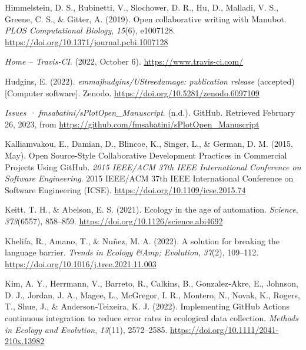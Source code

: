 \begin{CSLReferences}{1}{0}
\leavevmode{}%
Himmelstein, D. S., Rubinetti, V., Slochower, D. R., Hu, D., Malladi, V. S., Greene, C. S., \& Gitter, A. (2019). Open collaborative writing with Manubot. \emph{PLOS Computational Biology}, \emph{15}(6), e1007128. \url{https://doi.org/10.1371/journal.pcbi.1007128}

\leavevmode{}%
\emph{Home -- Travis-CI}. (2022, October 6). \url{https://www.travis-ci.com/}

\leavevmode{}%
Hudgins, E. (2022). \emph{emmajhudgins/UStreedamage: publication release} (accepted) {[}Computer software{]}. Zenodo. \url{https://doi.org/10.5281/zenodo.6097109}

\leavevmode{}%
\emph{Issues · fmsabatini/sPlotOpen\_Manuscript}. (n.d.). GitHub. Retrieved February 26, 2023, from \url{https://github.com/fmsabatini/sPlotOpen_Manuscript}

\leavevmode{}%
Kalliamvakou, E., Damian, D., Blincoe, K., Singer, L., \& German, D. M. (2015, May). Open Source-Style Collaborative Development Practices in Commercial Projects Using GitHub. \emph{2015 IEEE/ACM 37th IEEE International Conference on Software Engineering}. 2015 IEEE/ACM 37th IEEE International Conference on Software Engineering (ICSE). \url{https://doi.org/10.1109/icse.2015.74}

\leavevmode{}%
Keitt, T. H., \& Abelson, E. S. (2021). Ecology in the age of automation. \emph{Science}, \emph{373}(6557), 858--859. \url{https://doi.org/10.1126/science.abi4692}

\leavevmode{}%
Khelifa, R., Amano, T., \& Nuñez, M. A. (2022). A solution for breaking the language barrier. \emph{Trends in Ecology \&Amp; Evolution}, \emph{37}(2), 109--112. \url{https://doi.org/10.1016/j.tree.2021.11.003}

\leavevmode{}%
Kim, A. Y., Herrmann, V., Barreto, R., Calkins, B., Gonzalez‐Akre, E., Johnson, D. J., Jordan, J. A., Magee, L., McGregor, I. R., Montero, N., Novak, K., Rogers, T., Shue, J., \& Anderson‐Teixeira, K. J. (2022). Implementing GitHub Actions continuous integration to reduce error rates in ecological data collection. \emph{Methods in Ecology and Evolution}, \emph{13}(11), 2572--2585. \url{https://doi.org/10.1111/2041-210x.13982}


\end{CSLReferences}
